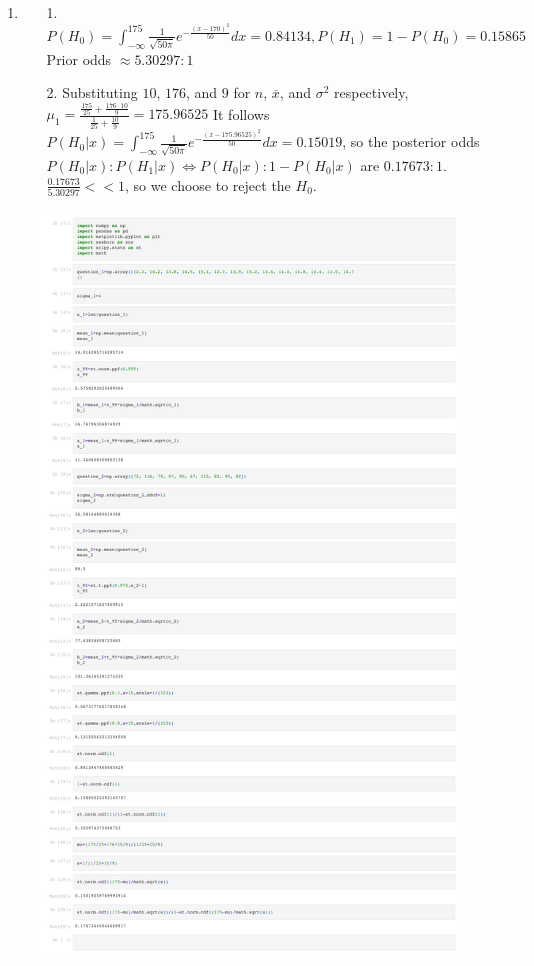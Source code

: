 \documentclass[10pt]{article}
\begin{document}
\begin{enumerate}[label=\textbf{Problem \arabic*.}]
\begin{itemize}
\end{itemize}
\item \begin{itemize}
    \item [1.] $P(H_0)=\int_{-\infty}^{175}\frac{1}{\sqrt{50\pi}}e^{-\frac{{(x-170)}^2}{50}}dx=0.84134,P(H_1)=1-P(H_0)=0.15865$ Prior odds $\approx 5.30297:1$
    \item [2.] Substituting $10$, $176$, and $9$ for $n$, $\overline{x}$, and $\sigma^2$ respectively, $\mu_1=\frac{\frac{175}{25}+\frac{176\cdot10}{9}}{\frac{1}{25}+\frac{10}{9}}=175.96525$
    It follows $P(H_0|x)=\int_{-\infty}^{175}\frac{1}{\sqrt{50\pi}}e^{-\frac{{(x-175.96525)}^2}{50}}dx=0.15019$, so the posterior odds $P(H_0|x):P(H_1|x)\Leftrightarrow P(H_0|x):1-P(H_0|x)$ are $0.17673:1$. $\frac{0.17673}{5.30297}<<1$, so we choose to reject the $H_0$.
\end{itemize}
\end{enumerate}
\begin{figure}
    \centering
    \includegraphics[scale=0.3]{Math 170S homework 3.pdf}
\end{figure}
\end{document}
